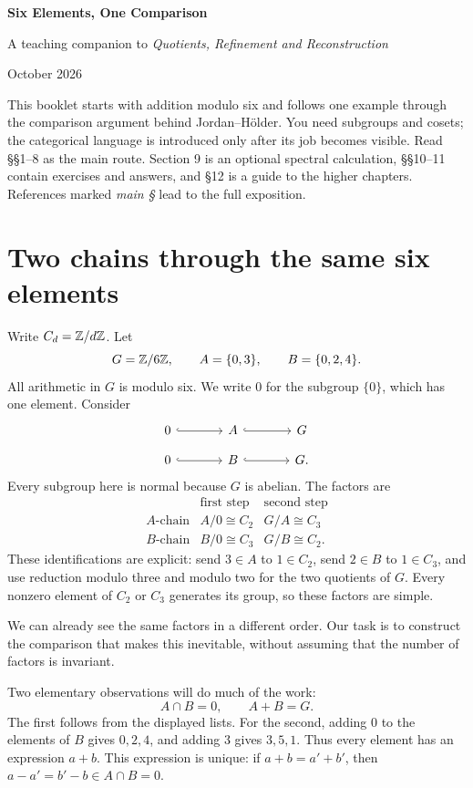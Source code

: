 {\LARGE\bfseries Six Elements, One Comparison}\par
{\large A teaching companion to \emph{Quotients, Refinement and Reconstruction}}\par
{\small October 2026}

This booklet starts with addition modulo six and follows one example through
the comparison argument behind Jordan--Hölder. You need subgroups and cosets;
the categorical language is introduced only after its job becomes visible.
Read §§1--8 as the main route. Section 9 is an optional spectral calculation,
§§10--11 contain exercises and answers, and §12 is a guide to the higher chapters.
References marked \emph{main §} lead to the full exposition.

\section{Two chains through the same six elements}\label{c:chains}
Write \(C_d=\mathbb Z/d\mathbb Z\). Let
\[
 G=\mathbb Z/6\mathbb Z,\qquad A=\{0,3\},\qquad B=\{0,2,4\}.
\]
All arithmetic in \(G\) is modulo six. We write \(0\) for the subgroup
\(\{0\}\), which has one element. Consider
\[
\begin{tikzcd}[column sep=large,row sep=small]
0\arrow[r,hook]&A\arrow[r,hook]&G\\
0\arrow[r,hook]&B\arrow[r,hook]&G.
\end{tikzcd}
\]
Every subgroup here is normal because \(G\) is abelian. The factors are
\[
\begin{array}{c|cc}
 &\text{first step}&\text{second step}\\ \hline
 A\text{-chain}&A/0\cong C_2&G/A\cong C_3\\
 B\text{-chain}&B/0\cong C_3&G/B\cong C_2 .
\end{array}
\]
These identifications are explicit: send \(3\in A\) to \(1\in C_2\),
send \(2\in B\) to \(1\in C_3\), and use reduction modulo three and modulo
two for the two quotients of \(G\). Every nonzero element of \(C_2\) or
\(C_3\) generates its group, so these factors are simple.

We can already see the same factors in a different order. Our task is to
construct the comparison that makes this inevitable, without assuming that
the number of factors is invariant.

Two elementary observations will do much of the work:
\[
 A\cap B=0,\qquad A+B=G.
\]
The first follows from the displayed lists. For the second, adding \(0\) to
the elements of \(B\) gives \(0,2,4\), and adding \(3\) gives \(3,5,1\).
Thus every element has an expression \(a+b\). This expression is unique:
if \(a+b=a'+b'\), then \(a-a'=b'-b\in A\cap B=0\).

